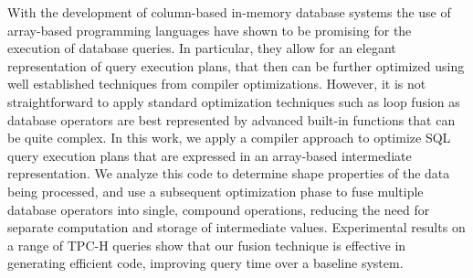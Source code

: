 With the development of column-based in-memory database systems the use of
array-based programming languages have shown to be promising for the execution
of database queries. In particular, they allow for an elegant representation of
query execution plans, that then can be further optimized using well
established techniques from compiler optimizations. However, it is not
straightforward to apply standard optimization techniques such as loop fusion
as database operators are best represented by advanced built-in functions that
can be quite complex. 
In this work, we apply a compiler approach to optimize SQL query execution
plans that are expressed in an array-based intermediate representation. We
analyze this code to determine shape properties of the data being
processed, and use a subsequent optimization phase to fuse multiple database
operators into single, compound operations, reducing the need for separate
computation and storage of intermediate values.  Experimental results on a
range of TPC-H queries show that our fusion technique is effective in
generating efficient code, improving query time over a baseline system.




